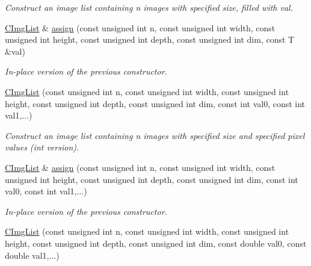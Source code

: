 \begin{DoxyCompactItemize}
\begin{DoxyCompactList}\small\item\em Construct an image list containing n images with specified size, filled with val. \end{DoxyCompactList}\item 
\hypertarget{structcimg__library_1_1_c_img_list_a212d98ed848351cf4f23910e717a4878}{\hyperlink{structcimg__library_1_1_c_img_list}{C\-Img\-List} \& \hyperlink{structcimg__library_1_1_c_img_list_a212d98ed848351cf4f23910e717a4878}{assign} (const unsigned int n, const unsigned int width, const unsigned int height, const unsigned int depth, const unsigned int dim, const T \&val)}\label{structcimg__library_1_1_c_img_list_a212d98ed848351cf4f23910e717a4878}

\begin{DoxyCompactList}\small\item\em In-\/place version of the previous constructor. \end{DoxyCompactList}\item 
\hypertarget{structcimg__library_1_1_c_img_list_ab6805e7f3472f617b232cfb51a96e961}{\hyperlink{structcimg__library_1_1_c_img_list_ab6805e7f3472f617b232cfb51a96e961}{C\-Img\-List} (const unsigned int n, const unsigned int width, const unsigned int height, const unsigned int depth, const unsigned int dim, const int val0, const int val1,...)}\label{structcimg__library_1_1_c_img_list_ab6805e7f3472f617b232cfb51a96e961}

\begin{DoxyCompactList}\small\item\em Construct an image list containing n images with specified size and specified pixel values (int version). \end{DoxyCompactList}\item 
\hypertarget{structcimg__library_1_1_c_img_list_a73414fe393853e064b6a21c28e099d00}{\hyperlink{structcimg__library_1_1_c_img_list}{C\-Img\-List} \& \hyperlink{structcimg__library_1_1_c_img_list_a73414fe393853e064b6a21c28e099d00}{assign} (const unsigned int n, const unsigned int width, const unsigned int height, const unsigned int depth, const unsigned int dim, const int val0, const int val1,...)}\label{structcimg__library_1_1_c_img_list_a73414fe393853e064b6a21c28e099d00}

\begin{DoxyCompactList}\small\item\em In-\/place version of the previous constructor. \end{DoxyCompactList}\item 
\hypertarget{structcimg__library_1_1_c_img_list_ac2995036e2ebec706931bd739933d3bc}{\hyperlink{structcimg__library_1_1_c_img_list_ac2995036e2ebec706931bd739933d3bc}{C\-Img\-List} (const unsigned int n, const unsigned int width, const unsigned int height, const unsigned int depth, const unsigned int dim, const double val0, const double val1,...)}\label{structcimg__library_1_1_c_img_list_ac2995036e2ebec706931bd739933d3bc}


\end{DoxyCompactItemize}
